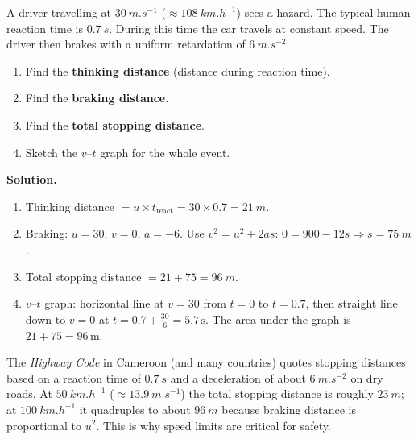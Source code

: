 \documentclass[11pt]{article}
\begin{document}
\begin{experience}
A driver travelling at $\SI{30}{m.s^{-1}}$ ($\approx \SI{108}{km.h^{-1}}$) sees a hazard. The typical human reaction time is $\SI{0.7}{s}$. During this time the car travels at constant speed. The driver then brakes with a uniform retardation of $\SI{6}{m.s^{-2}}$.
\begin{enumerate}
\item Find the \textbf{thinking distance} (distance during reaction time).
\item Find the \textbf{braking distance}.
\item Find the \textbf{total stopping distance}.
\item Sketch the $v$–$t$ graph for the whole event.
\end{enumerate}
\tcblower
\textbf{Solution.}
\begin{enumerate}
\item Thinking distance $= u \times t_{\text{react}} = 30 \times 0.7 = \SI{21}{m}$.
\item Braking: $u=30$, $v=0$, $a=-6$. Use $v^2=u^2+2as$: $0 = 900 - 12s \Rightarrow s = \SI{75}{m}$.
\item Total stopping distance $= 21 + 75 = \boxed{\SI{96}{m}}$.
\item $v$–$t$ graph: horizontal line at $v=30$ from $t=0$ to $t=0.7$, then straight line down to $v=0$ at $t = 0.7 + \frac{30}{6} = 5.7\,\text{s}$. The area under the graph is $21 + 75 = 96\,\text{m}$.
\end{enumerate}
\end{experience}

\begin{savaistu}
The \emph{Highway Code} in Cameroon (and many countries) quotes stopping distances based on a reaction time of $\SI{0.7}{s}$ and a deceleration of about $\SI{6}{m.s^{-2}}$ on dry roads. At $\SI{50}{km.h^{-1}}$ ($\approx \SI{13.9}{m.s^{-1}}$) the total stopping distance is roughly $\SI{23}{m}$; at $\SI{100}{km.h^{-1}}$ it quadruples to about $\SI{96}{m}$ because braking distance is proportional to $u^2$. This is why speed limits are critical for safety.
\end{savaistu}
\end{document}
